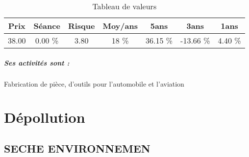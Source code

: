 \documentclass[11pt,a4paper]{report}%
\begin{document}
\begin{table}[H]
  \centering
    \begin{tabular}{|c|c|c|c|c|c|c|}
    \hline
    Prix & Séance & Risque  & Moy/ans & 5ans & 3ans & 1ans \\
    \hline
    38.00 &    0.00 \%    & 3.80 & 18 \% & 36.15 \% & -13.66 \% & 4.40 \% \\
    \hline
    \end{tabular}%
        \label{tab:table_LE BELIER}%
      \caption{Tableau de valeurs}
\end{table}%

\paragraph{Ses activités sont : } Fabrication de pièce, d’outils pour l’automobile et l’aviation 
    
    \newpage\chapter{Dépollution}


\section{SECHE ENVIRONNEMEN}
\end{document}
